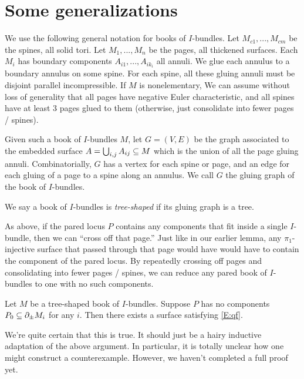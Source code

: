 {\section{Some generalizations}

We use the following general notation for books of $I$-bundles. Let
$M_{c1},...,M_{cm}$ be the spines, all solid tori. Let $M_1,...,M_n$ be the
pages, all thickened surfaces. Each $M_i$ has boundary components
$A_{i1},...,A_{ik_i}$ all annuli. We glue each annulus to a boundary annulus on
some spine. For each spine, all these gluing annuli must be disjoint parallel
incompressible. If $M$ is nonelementary, We can assume without loss of
generality that all pages have negative Euler characteristic, and all spines
have at least 3 pages glued to them (otherwise, just consolidate into fewer
pages / spines).

Given such a book of $I$-bundles $M$, let $G=(V,E)$ be the graph associated to
the embedded surface $A = \bigcup_{i,j} A_{ij} \subseteq M$ which is the union of
all the page gluing annuli. Combinatorially, $G$ has a vertex for each spine or
page, and an edge for each gluing of a page to a spine along an annulus. We
call $G$ the gluing graph of the book of $I$-bundles.

We say a book of $I$-bundles is \emph{tree-shaped} if its gluing graph is
a tree.

As above, if the pared locus $P$ contains any components that fit inside
a single $I$-bundle, then we can ``cross off that page.'' Just like in our
earlier lemma, any $\pi_1$-injective surface that passed through that page
would have would have to contain the component of the pared locus. By
repeatedly crossing off pages and consolidating into fewer pages / spines, we
can reduce any pared book of $I$-bundles to one with no such components.

\begin{conj}

Let $M$ be a tree-shaped book of $I$-bundles. Suppose $P$ has no components
$P_0\subseteq \partial_\pm M_i$ for any $i$. Then there exists a surface satisfying
\eqref{E:qf}.

\end{conj}

We're quite certain that this is true. It should just be a hairy inductive
adaptation of the above argument. In particular, it is totally unclear how one
might construct a counterexample. However, we haven't completed a full proof
yet.

}
